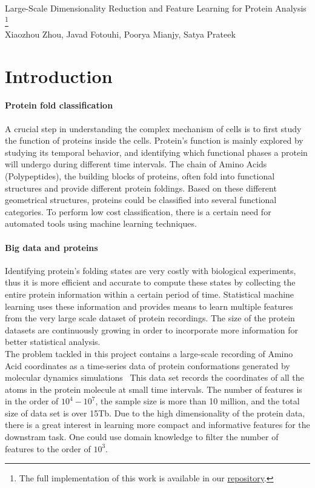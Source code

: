 \documentclass{article}
\begin{document}
\begingroup  
  \centering
  \LARGE Large-Scale Dimensionality Reduction and Feature Learning for Protein Analysis \footnote{The full implementation of this work is available in our \href{https://bitbucket.org/mianjy/cs600.615}{repository}.} \\[1.5em]
  \large Xiaozhou Zhou, Javad Fotouhi, Poorya Mianjy, Satya Prateek \par
\endgroup


\section{Introduction}

\paragraph{Protein fold classification} A crucial step in understanding the complex mechanism of cells is to first study the function of proteins inside the cells. Protein's function is mainly explored by studying its temporal behavior, and identifying which functional phases a protein will undergo during different time intervals. The chain of Amino Acids (Polypeptides), the building blocks of proteins, often fold into functional structures and provide different protein foldings. Based on these different geometrical structures, proteins could be classified into several functional categories. To perform low cost classification, there is a certain need for automated tools using machine learning techniques. 

\paragraph{Big data and proteins} Identifying protein's folding states are very costly with biological experiments, thus it is more efficient and accurate to compute these states by collecting the entire protein information within a certain period of time. Statistical machine learning uses these information and provides means to learn multiple features from the very large scale dataset of protein recordings. The size of the protein datasets are continuously growing in order to incorporate more information for better statistical analysis.\\

The problem tackled in this project contains a large-scale recording of Amino Acid coordinates as a time-series data of protein conformations generated by molecular dynamics simulations~\cite{nutanong2013adaptive} This data set records the coordinates of all the atoms in the protein molecule at small time intervals. The number of features is in the order of $10^4 - 10^7$, the sample size is more than 10 million, and the total size of data set is over 15Tb. Due to the high dimensionality of the protein data, there is a great interest in learning more compact and informative features for the downstram task.  One could use domain knowledge to filter the number of features to the order of $10^3$.
\end{document}
